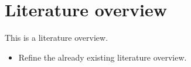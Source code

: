 \section*{Literature overview}

This is a literature overview.

\begin{itemize}
    \item Refine the already existing literature overview.
\end{itemize}
